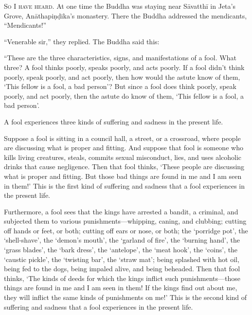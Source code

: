 \documentclass[12pt,openany]{book}%
\newcommand*{\scevam}[1]{\textsc{#1}}
\begin{document}
\scevam{So I have heard. }At one time the Buddha was staying near \textsanskrit{Sāvatthī} in Jeta’s Grove, \textsanskrit{Anāthapiṇḍika}’s monastery. There the Buddha addressed the mendicants, “Mendicants!” 

“Venerable sir,” they replied. The Buddha said this: 

“These are the three characteristics, signs, and manifestations of a fool. What three? A fool thinks poorly, speaks poorly, and acts poorly. If a fool didn’t think poorly, speak poorly, and act poorly, then how would the astute know of them, ‘This fellow is a fool, a bad person’? But since a fool does think poorly, speak poorly, and act poorly, then the astute do know of them, ‘This fellow is a fool, a bad person’. 

A fool experiences three kinds of suffering and sadness in the present life. 

Suppose a fool is sitting in a council hall, a street, or a crossroad, where people are discussing what is proper and fitting. And suppose that fool is someone who kills living creatures, steals, commits sexual misconduct, lies, and uses alcoholic drinks that cause negligence. Then that fool thinks, ‘These people are discussing what is proper and fitting. But those bad things are found in me and I am seen in them!’ This is the first kind of suffering and sadness that a fool experiences in the present life. 

Furthermore, a fool sees that the kings have arrested a bandit, a criminal, and subjected them to various punishments—whipping, caning, and clubbing; cutting off hands or feet, or both; cutting off ears or nose, or both; the ‘porridge pot’, the ‘shell-shave’, the ‘demon’s mouth’, the ‘garland of fire’, the ‘burning hand’, the ‘grass blades’, the ‘bark dress’, the ‘antelope’, the ‘meat hook’, the ‘coins’, the ‘caustic pickle’, the ‘twisting bar’, the ‘straw mat’; being splashed with hot oil, being fed to the dogs, being impaled alive, and being beheaded. Then that fool thinks, ‘The kinds of deeds for which the kings inflict such punishments—those things are found in me and I am seen in them! If the kings find out about me, they will inflict the same kinds of punishments on me!’ This is the second kind of suffering and sadness that a fool experiences in the present life. 
\end{document}
